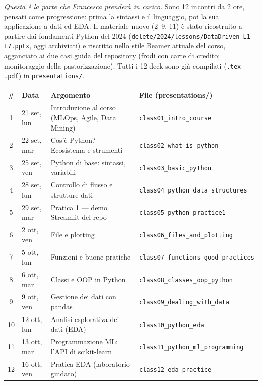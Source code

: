 \documentclass[11pt,a4paper]{article}
\begin{document}
\textit{Questa è la parte che Francesca prenderà in carico.} Sono 12 incontri da 2 ore, pensati come progressione: prima la sintassi e il linguaggio, poi la sua applicazione a dati ed EDA. Il materiale nuovo (2--9, 11) è stato ricostruito a partire dai fondamenti Python del 2024 (\texttt{delete/2024/lessons/DataDriven\_L1--L7.pptx}, oggi archiviati) e riscritto nello stile Beamer attuale del corso, agganciato ai due casi guida del repository (frodi con carte di credito; monitoraggio della pastorizzazione). Tutti i 12 deck sono già compilati (\texttt{.tex} + \texttt{.pdf}) in \texttt{presentations/}.

\begin{center}
\begin{tabularx}{\textwidth}{@{}c l X l@{}}
\toprule
\textbf{\#} & \textbf{Data} & \textbf{Argomento} & \textbf{File (presentations/)} \\
\midrule
1 & 21 set, lun & Introduzione al corso (MLOps, Agile, Data Mining) & \texttt{class01\_intro\_course} \\
2 & 22 set, mar & Cos'è Python? Ecosistema e strumenti & \texttt{class02\_what\_is\_python} \\
3 & 25 set, ven & Python di base: sintassi, variabili & \texttt{class03\_basic\_python} \\
4 & 28 set, lun & Controllo di flusso e strutture dati & \texttt{class04\_python\_data\_structures} \\
5 & 29 set, mar & Pratica 1 --- demo Streamlit del repo & \texttt{class05\_python\_practice1} \\
6 & 2 ott, ven & File e plotting & \texttt{class06\_files\_and\_plotting} \\
7 & 5 ott, lun & Funzioni e buone pratiche & \texttt{class07\_functions\_good\_practices} \\
8 & 6 ott, mar & Classi e OOP in Python & \texttt{class08\_classes\_oop\_python} \\
9 & 9 ott, ven & Gestione dei dati con pandas & \texttt{class09\_dealing\_with\_data} \\
10 & 12 ott, lun & Analisi esplorativa dei dati (EDA) & \texttt{class10\_python\_eda} \\
11 & 13 ott, mar & Programmazione ML: l'API di scikit-learn & \texttt{class11\_python\_ml\_programming} \\
12 & 16 ott, ven & Pratica EDA (laboratorio guidato) & \texttt{class12\_eda\_practice} \\
\bottomrule
\end{tabularx}
\end{center}
\end{document}
